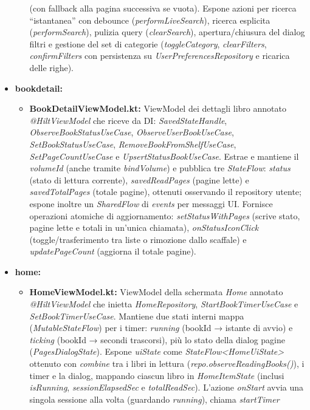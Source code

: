 \documentclass{article}
\begin{document}
\begin{itemize}
\begin{itemize}
    (con fallback alla pagina successiva se vuota). Espone azioni per ricerca “istantanea” con debounce (\textit{performLiveSearch}), ricerca esplicita (\textit{performSearch}), pulizia query (\textit{clearSearch}), apertura/chiusura del dialog filtri e gestione del set di categorie (\textit{toggleCategory}, \textit{clearFilters}, 
    \textit{confirmFilters} con persistenza su \textit{UserPreferencesRepository} e ricarica delle righe).
  \end{itemize}
  \item \textbf{bookdetail:}
  \begin{itemize}
    \item \textbf{BookDetailViewModel.kt:} ViewModel dei dettagli libro annotato \textit{@HiltViewModel} che riceve da DI: \textit{SavedStateHandle}, \textit{ObserveBookStatusUseCase}, \textit{ObserveUserBookUseCase}, \textit{SetBookStatusUseCase}, \textit{RemoveBookFromShelfUseCase}, 
    \textit{SetPageCountUseCase} e \textit{UpsertStatusBookUseCase}. Estrae e mantiene il \textit{volumeId} (anche tramite \textit{bindVolume}) e pubblica tre \textit{StateFlow}: \textit{status} (stato di lettura corrente), \textit{savedReadPages} (pagine lette) e \textit{savedTotalPages} (totale pagine), 
    ottenuti osservando il repository utente; espone inoltre un \textit{SharedFlow} di \textit{events} per messaggi UI. Fornisce operazioni atomiche di aggiornamento: \textit{setStatusWithPages} (scrive stato, pagine lette e totali in un’unica chiamata), \textit{onStatusIconClick} (toggle/trasferimento tra liste o rimozione dallo scaffale) e \textit{updatePageCount} (aggiorna il totale pagine).
  \end{itemize}
  \item \textbf{home:}
  \begin{itemize}
    \item \textbf{HomeViewModel.kt:} ViewModel della schermata \emph{Home} annotato \textit{@HiltViewModel} che inietta \textit{HomeRepository}, \textit{StartBookTimerUseCase} e \textit{SetBookTimerUseCase}. Mantiene due stati interni mappa (\textit{MutableStateFlow}) per i timer: \emph{running} (bookId → istante di avvio) e \emph{ticking} (bookId → secondi trascorsi), più lo stato della dialog pagine (\textit{PagesDialogState}). 
    Espone \textit{uiState} come \textit{StateFlow<HomeUiState>} ottenuto con \textit{combine} tra i libri in lettura (\textit{repo.observeReadingBooks()}), i timer e la dialog, mappando ciascun libro in \textit{HomeItemState} (inclusi \emph{isRunning}, \emph{sessionElapsedSec} e \emph{totalReadSec}). L’azione \emph{onStart} avvia una singola sessione alla volta (guardando \emph{running}), chiama \textit{startTimer} 

\end{itemize}
\end{itemize}
\end{document}
